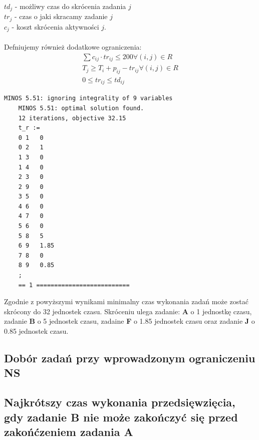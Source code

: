 \documentclass[
    12pt, %
]{../fphw}
\begin{document}
\(td_j\) - możliwy czas do skrócenia zadania \(j\) \\
\(tr_j\) - czas o jaki skracamy zadanie \(j\) \\
\(c_j\) - koszt skrócenia aktywności \(j\). \\ \\
Defniujemy również dodatkowe ograniczenia:
\begin{align*}
    \sum c_{ij} \cdot tr_{ij} \leq 200 \forall (i, j) \in R \\
    T_j \geq T_i + p_{ij} - tr_{ij} \forall (i,j) \in R \\
    0 \leq tr_{ij} \leq td_{ij}
\end{align*}


\begin{lstlisting}[caption=Rozwiązanie znalezione solwerem minos]
    MINOS 5.51: ignoring integrality of 9 variables
    MINOS 5.51: optimal solution found.
    12 iterations, objective 32.15
    t_r :=
    0 1   0
    0 2   1
    1 3   0
    1 4   0
    2 3   0
    2 9   0
    3 5   0
    4 6   0
    4 7   0
    5 6   0
    5 8   5
    6 9   1.85
    7 8   0
    8 9   0.85
    ;
    == 1 ==========================
\end{lstlisting}
Zgodnie z powyższymi wynikami minimalny czas wykonania zadań może zostać skrócony do 32 jednostek czasu.
Skróceniu ulega zadanie: \textbf{A} o 1 jednostkę czasu, 
zadanie \textbf{B} o 5 jednostek czasu, zadaine \textbf{F} o 1.85 jednostek czasu
oraz zadanie \textbf{J} o 0.85 jednostek czasu.
\subsection{Dobór zadań przy wprowadzonym ograniczeniu NS}
\subsection{Najkrótszy czas wykonania przedsięwzięcia, gdy zadanie B nie może zakończyć się przed zakońćzeniem zadania A}
\newpage
\lstlistoflistings
\listoffigures
\listoftables
\end{document}
